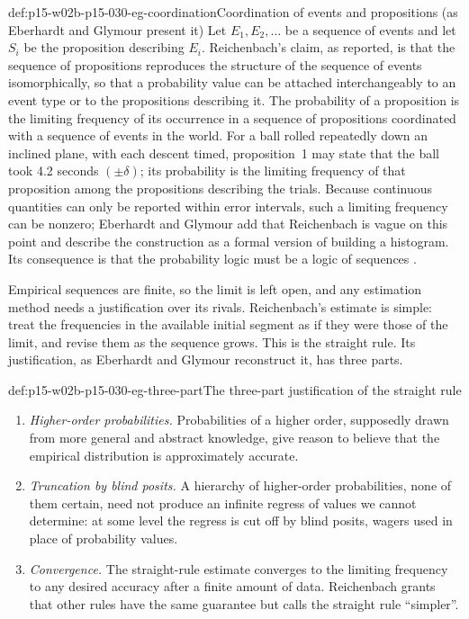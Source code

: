\begin{hbdefinition}{def:p15-w02b-p15-030-eg-coordination}{Coordination of events and propositions (as Eberhardt and Glymour present it)}
Let \(E_1,E_2,\ldots\) be a sequence of events and let \(S_i\) be the
proposition describing \(E_i\). Reichenbach's claim, as reported, is
that the sequence of propositions reproduces the structure of the
sequence of events isomorphically, so that a probability value can be
attached interchangeably to an event type or to the propositions
describing it. The probability of a proposition is the limiting
frequency of its occurrence in a sequence of propositions coordinated
with a sequence of events in the world. For a ball rolled repeatedly
down an inclined plane, with each descent timed, proposition~1 may
state that the ball took 4.2 seconds \((\pm\delta)\); its probability
is the limiting frequency of that proposition among the propositions
describing the trials. Because continuous quantities can only be
reported within error intervals, such a limiting frequency can be
nonzero; Eberhardt and Glymour add that Reichenbach is vague on this point and
describe the construction as a formal version of building a histogram.
Its consequence is that the probability logic must be a logic of
sequences \cite[pp.~361--362]{EberhardtGlymour2011ReichenbachReading}.
\end{hbdefinition}

Empirical sequences are finite, so the limit is left open, and any
estimation method needs a justification over its rivals. Reichenbach's
estimate is simple: treat the frequencies in the available initial
segment as if they were those of the limit, and revise them as the
sequence grows. This is the straight rule. Its justification, as Eberhardt and Glymour reconstruct it, has three parts.

\begin{hbdefinition}{def:p15-w02b-p15-030-eg-three-part}{The three-part justification of the straight rule}
\begin{enumerate}
\item \emph{Higher-order probabilities.} Probabilities of a higher
  order, supposedly drawn from more general and abstract knowledge, give
  reason to believe that the empirical distribution is approximately
  accurate.
\item \emph{Truncation by blind posits.} A hierarchy of higher-order
  probabilities, none of them certain, need not produce an infinite
  regress of values we cannot determine: at some level the regress is
  cut off by blind posits, wagers used in place of probability values.
\item \emph{Convergence.} The straight-rule estimate converges to the
  limiting frequency to any desired accuracy after a finite amount of
  data. Reichenbach grants that other rules have the same guarantee but
  calls the straight rule ``simpler''.
\end{enumerate}
\cite[p.~362]{EberhardtGlymour2011ReichenbachReading}
\end{hbdefinition}

